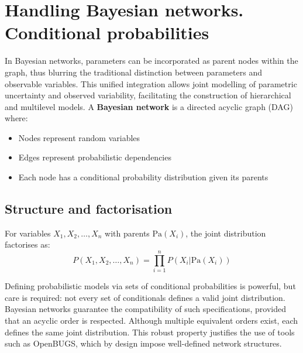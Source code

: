 \section{Handling Bayesian networks. Conditional probabilities}
In Bayesian networks, parameters can be incorporated as parent nodes within the graph, thus blurring the traditional distinction between parameters and observable variables. This unified integration allows joint modelling of parametric uncertainty and observed variability, facilitating the construction of hierarchical and multilevel models.
A \textbf{Bayesian network} is a directed acyclic graph (DAG) where:
\begin{itemize}
\item Nodes represent random variables
\item Edges represent probabilistic dependencies
\item Each node has a conditional probability distribution given its parents
\end{itemize}
\subsection{Structure and factorisation}
For variables $X_1, X_2, \dots, X_n$ with parents $\text{Pa}(X_i)$, the joint distribution factorises as:
\begin{equation}\label{eq:bn_factorization}
\boxed{P(X_1, X_2, \dots, X_n) = \prod_{i=1}^n P(X_i | \text{Pa}(X_i))}
\end{equation}

Defining probabilistic models via sets of conditional probabilities is powerful, but care is required: not every set of conditionals defines a valid joint distribution. Bayesian networks guarantee the compatibility of such specifications, provided that an acyclic order is respected. Although multiple equivalent orders exist, each defines the same joint distribution. This robust property justifies the use of tools such as OpenBUGS, which by design impose well-defined network structures.

